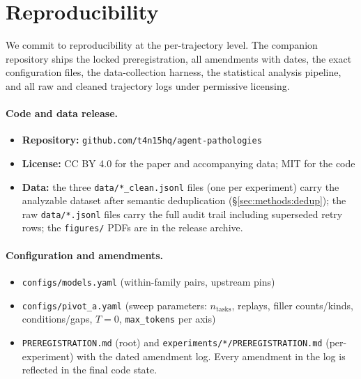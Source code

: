 \section{Reproducibility}
\label{sec:reproducibility}

We commit to reproducibility at the per-trajectory level. The companion
repository ships the locked preregistration, all amendments with dates,
the exact configuration files, the data-collection harness, the
statistical analysis pipeline, and all raw and cleaned trajectory logs
under permissive licensing.

\paragraph{Code and data release.}
\begin{itemize}
  \item \textbf{Repository:}
        \texttt{github.com/t4n15hq/agent-pathologies}
  \item \textbf{License:} CC BY 4.0 for the paper and accompanying
        data; MIT for the code
  \item \textbf{Data:} the three \texttt{data/*\_clean.jsonl} files (one
        per experiment) carry the analyzable dataset after semantic
        deduplication (\S\ref{sec:methods:dedup}); the raw
        \texttt{data/*.jsonl} files carry the full audit trail
        including superseded retry rows; the \texttt{figures/} PDFs
        are in the release archive.
\end{itemize}

\paragraph{Configuration and amendments.}
\begin{itemize}
  \item \texttt{configs/models.yaml} (within-family pairs, upstream pins)
  \item \texttt{configs/pivot\_a.yaml} (sweep parameters: $n_{\mathrm{tasks}}$,
        replays, filler counts/kinds, conditions/gaps, $T = 0$,
        \texttt{max\_tokens} per axis)
  \item \texttt{PREREGISTRATION.md} (root) and
        \texttt{experiments/*/PREREGISTRATION.md} (per-experiment) with
        the dated amendment log. Every amendment in the log is reflected
        in the final code state.
\end{itemize}

